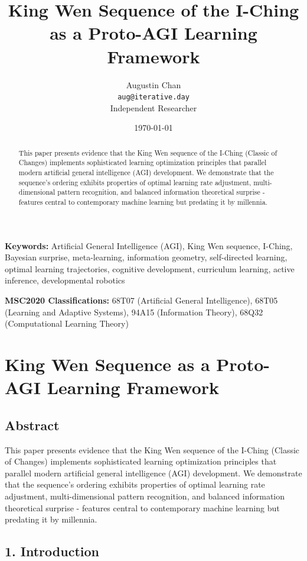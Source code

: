 \documentclass{article}
\title{King Wen Sequence of the I-Ching as a Proto-AGI Learning Framework}
\author{Augustin Chan\\
\texttt{aug@iterative.day}\\
Independent Researcher}
\date{\today}
\begin{document}
\maketitle

\begin{abstract}
This paper presents evidence that the King Wen sequence of the I-Ching
(Classic of Changes) implements sophisticated learning optimization
principles that parallel modern artificial general intelligence (AGI)
development. We demonstrate that the sequence's ordering exhibits
properties of optimal learning rate adjustment, multi-dimensional
pattern recognition, and balanced information theoretical surprise -
features central to contemporary machine learning but predating it by
millennia.
\end{abstract}

\textbf{Keywords:} Artificial General Intelligence (AGI), King Wen sequence, 
I-Ching, Bayesian surprise, meta-learning, information geometry, 
self-directed learning, optimal learning trajectories, cognitive development, 
curriculum learning, active inference, developmental robotics

\textbf{MSC2020 Classifications:} 68T07 (Artificial General Intelligence), 
68T05 (Learning and Adaptive Systems), 94A15 (Information Theory), 
68Q32 (Computational Learning Theory)

\hypertarget{king-wen-sequence-as-a-proto-agi-learning-framework}{%
\section{King Wen Sequence as a Proto-AGI Learning
Framework}\label{king-wen-sequence-as-a-proto-agi-learning-framework}}

\hypertarget{abstract}{%
\subsection{Abstract}\label{abstract}}

This paper presents evidence that the King Wen sequence of the I-Ching
(Classic of Changes) implements sophisticated learning optimization
principles that parallel modern artificial general intelligence (AGI)
development. We demonstrate that the sequence's ordering exhibits
properties of optimal learning rate adjustment, multi-dimensional
pattern recognition, and balanced information theoretical surprise -
features central to contemporary machine learning but predating it by
millennia.

\hypertarget{introduction}{%
\subsection{1. Introduction}\label{introduction}}
\end{document}
